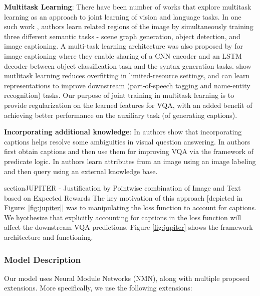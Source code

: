 \noindent\textbf{Multitask Learning}:
There have been number of works that explore multitask learning as an approach to joint learning of vision and language tasks. In one such work \cite{JustinJohnson2018}, authors  learn related regions of the image by simultaneously training three different semantic tasks - scene graph generation, object detection, and image captioning. A multi-task learning architecture was also proposed by \cite{zhao2018multi} for image captioning
where they enable sharing of a CNN encoder and an LSTM decoder
between object classification task and the syntax generation tasks.  \cite{ruder2017overview, lin2018multi} show mutlitask learning reduces overfitting in limited-resource settings, and can learn representations to improve downstream (part-of-speech tagging and name-entity recognition) tasks. Our purpose of joint training in multitask learning is to provide regularization on the learned features for VQA, with an added benefit of achieving better performance on the auxiliary task (of generating captions). 




\noindent\textbf{Incorporating additional knowledge}: In \cite{chandu2018textually} authors show that incorporating captions helps resolve some ambiguities in visual question answering. In \cite{aditya2018explicit} authors first obtain captions and then use them for improving VQA via the framework of predicate logic. In \cite{wu2016ask} authors learn attributes from an image using an image labeling and then query using an external knowledge base. 


section{JUPITER - Justification by Pointwise combination of Image and Text based on Expected Rewards}
 The key motivation of this approach [depicted in Figure: \ref{fig:jupiter}] was to manipulating the loss function to account for captions. We hyothesize that explicitly accounting for captions in the loss function will affect the downstream VQA predictions. Figure \ref{fig:jupiter} shows the framework architecture and functioning.

\subsubsection{Model Description}
Our model uses Neural Module Networks (NMN), along with multiple proposed extensions. More specifically, we use the following extensions:

